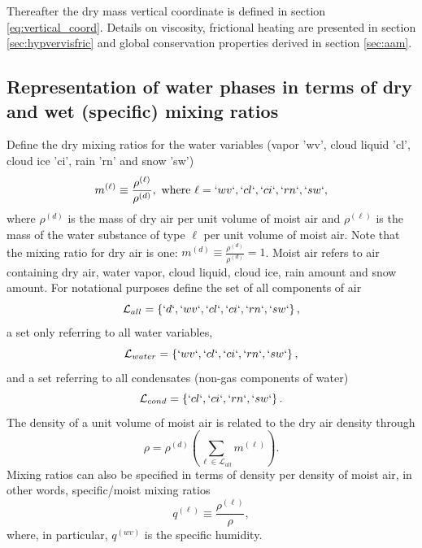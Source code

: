 \documentclass{agujournal}
\begin{document}
{Thereafter the dry mass vertical coordinate is defined in section \ref{eq:vertical_coord}. Details on viscosity, frictional heating are presented in section \ref{sec:hypvervisfric} and global conservation properties derived in section \ref{sec:aam}.
\subsection{Representation of water phases in terms of dry and wet (specific) mixing ratios}\label{sec:mixing_ratios}
Define the dry mixing ratios for the water variables (vapor 'wv', cloud liquid 'cl', cloud ice 'ci', rain 'rn' and snow 'sw')
\begin{equation}
m^{(\ell)}\equiv \frac{\rho^{(\ell)}}{\rho^{(d)}}, \text{ where }\ell=`wv`,`cl`,`ci`,`rn`,`sw`,\label{eq:mx}
\end{equation}
where $\rho^{(d)}$ is the mass of dry air per unit volume of moist air and $\rho^{(\ell)}$ is the mass of the water substance of type $\ell$ per unit volume of moist air. Note that the mixing ratio for dry air is one: $m^{(d)}\equiv \frac{\rho^{(d)}}{\rho^{(d)}}=1$. 
Moist air refers to air containing dry air, water vapor, cloud liquid, cloud ice, rain amount and snow amount. For notational purposes define the set of all components of air
\begin{equation}
\mathcal{L}_{all}=\left\{ `d`,`wv`,`cl`,`ci`,`rn`,`sw`\right\},
\end{equation}
a set only referring to all water variables,
\begin{equation}
\mathcal{L}_{water}=\left\{`wv`,`cl`,`ci`,`rn`,`sw`\right\},
\end{equation}
and a set referring to all condensates (non-gas components of water)
\begin{equation}
\mathcal{L}_{cond}=\left\{`cl`,`ci`,`rn`,`sw`\right\}.
\end{equation}
The density of a unit volume of moist air is related to the dry air density through
\begin{equation}
\label{eq:rhosum}
\rho=\rho^{(d)}\left(\sum_{\ell \in \mathcal{L}_{all}} m^{(\ell)}\right).
\end{equation}
Mixing ratios can also be specified in terms of density per density of moist air, in other words, specific/moist mixing ratios
\begin{equation}
q^{(\ell)}\equiv \frac{\rho^{(\ell)}}{\rho},\label{eq:qx}
\end{equation}
where, in particular, $q^{(wv)}$ is the specific humidity. 


}
\end{document}
